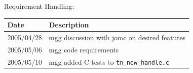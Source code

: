 Requirement Handling:

\begin{tabular}{|p{72pt}|p{351pt}|} \hline
Date & Description \\ \hline
2005/04/28 & mgg discussion with jomc on desired features\\ \hline
2005/05/06 & mgg code requirements\\ \hline
2005/05/10 & mgg added C tests to \texttt{tn\_new\_handle.c} \\ \hline
\end{tabular}
\vspace{24pt}
